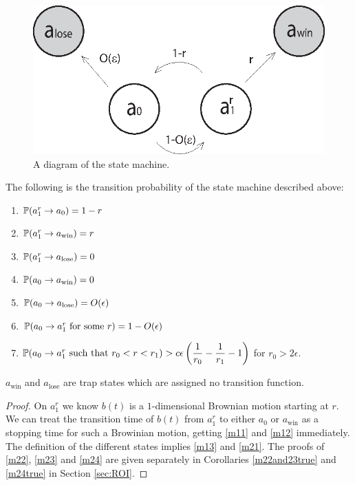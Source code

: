 { \begin{figure}[htb]
\begin{center}
\leavevmode
\includegraphics{state_machine.eps}
\end{center}
\caption{A diagram of the state machine.}
\label{fig:state_machine}
\end{figure}

\begin{propos}\label{prop:trans}
The following is the transition probability of the state machine described above:
\begin{enumerate}
\item\label{m11} $\P(a^r_1\rightarrow a_0)=1-r$
\item\label{m12} $\P(a^r_1\rightarrow a_\text{win})=r$
\item\label{m13} $\P(a^r_1\rightarrow a_\text{lose})=0$
\item\label{m21} $\P(a_0\rightarrow a_\text{win})=0$
\item\label{m22} $\P(a_0\rightarrow a_\text{lose})=O(\epsilon)$
\item\label{m23} $\P(a_0\rightarrow a^r_1 \text{ for some }r)=1-O(\epsilon)$
\item\label{m24} $\P(a_0\rightarrow a^r_1 \text{ such that } r_0<r<r_1)>\ds c\epsilon\left(\frac 1 {r_0}-\frac 1 {r_1}-1\right)$ for $r_0>2\epsilon$.
\end{enumerate}
$a_\text{win}$ and $a_\text{lose}$ are trap states which are assigned no transition function.
\end{propos}

\begin{proof}
 On $a^r_1$ we know $b(t)$ is a $1$-dimensional Brownian motion starting at $r$.
 We can treat the transition time of $b(t)$ from $a^r_1$ to either $a_0$ or
 $a_\text{win}$ as a stopping time for such a Browinian motion, getting
 \ref{m11} and \ref{m12} immediately. The definition of the different states
 implies \ref{m13} and \ref{m21}. The proofs of \ref{m22}, \ref{m23} and \ref{m24}
 are given separately in Corollaries \ref{m22and23true} and \ref{m24true} in Section \ref{sec:ROI}.
\end{proof}

}
